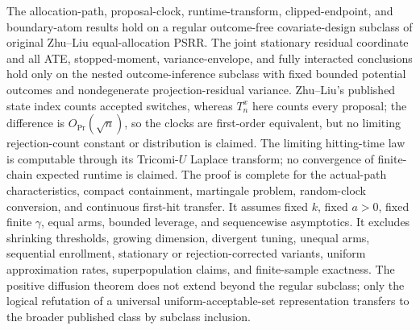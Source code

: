 \documentclass{article}
\begin{document}
The allocation-path, proposal-clock, runtime-transform, clipped-endpoint, and boundary-atom results hold on a regular outcome-free covariate-design subclass of original Zhu--Liu equal-allocation PSRR. The joint stationary residual coordinate and all ATE, stopped-moment, variance-envelope, and fully interacted conclusions hold only on the nested outcome-inference subclass with fixed bounded potential outcomes and nondegenerate projection-residual variance. Zhu--Liu's published state index counts accepted switches, whereas \(T_n^x\) here counts every proposal; the difference is \(O_{\Pr}(\sqrt n)\), so the clocks are first-order equivalent, but no limiting rejection-count constant or distribution is claimed. The limiting hitting-time law is computable through its Tricomi-\(U\) Laplace transform; no convergence of finite-chain expected runtime is claimed. The proof is complete for the actual-path characteristics, compact containment, martingale problem, random-clock conversion, and continuous first-hit transfer. It assumes fixed \(k\), fixed \(a>0\), fixed finite \(\gamma\), equal arms, bounded leverage, and sequencewise asymptotics. It excludes shrinking thresholds, growing dimension, divergent tuning, unequal arms, sequential enrollment, stationary or rejection-corrected variants, uniform approximation rates, superpopulation claims, and finite-sample exactness. The positive diffusion theorem does not extend beyond the regular subclass; only the logical refutation of a universal uniform-acceptable-set representation transfers to the broader published class by subclass inclusion.
\end{document}
